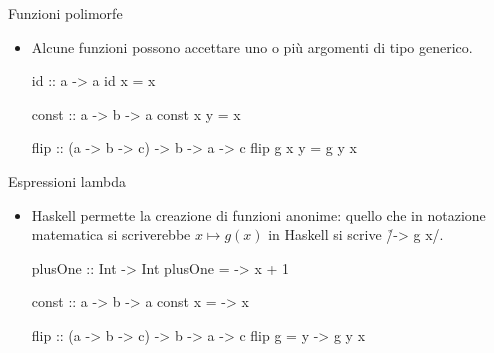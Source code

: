 \begin{frame}[fragile]{\secname}{Funzioni polimorfe}
\begin{itemize}
\item Alcune funzioni possono accettare uno o più argomenti di tipo generico.
\pause

\begin{haskellcode}
id :: a -> a
id x = x

const :: a -> b -> a
const x y = x

flip :: (a -> b -> c) -> b -> a -> c
flip g x y = g y x
\end{haskellcode}

\end{itemize}
\end{frame}

\begin{frame}[fragile]{\secname}{Espressioni lambda}
\begin{itemize}
\item Haskell permette la creazione di funzioni anonime: quello che in notazione matematica si scriverebbe $x\mapsto g(x)$ in Haskell si scrive \h/\x -> g x/.

\pause
\begin{haskellcode}
plusOne :: Int -> Int
plusOne = \x -> x + 1

const :: a -> b -> a
const x = \y -> x

flip :: (a -> b -> c) -> b -> a -> c
flip g = \x y -> g y x
\end{haskellcode}
\end{itemize}
\end{frame}
